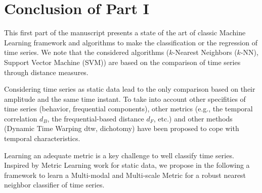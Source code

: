 \part*{Conclusion of Part I}
This first part of the manuscript presents a state of the art of classic Machine Learning framework and algorithms to make the classification or the regression of time series. We note that the considered algorithms ($k$-Nearest Neighbors ($k$-NN), Support Vector Machine (SVM)) are based on the comparison of time series through distance measures. 

Considering time series as static data lead to the only comparison based on their amplitude and the same time instant. To take into account other specifities of time series (behavior, frequential components), other metrics (e.g., the temporal correlation $d_B$, the frequential-based distance $d_F$, etc.) and other methods (Dynamic Time Warping {\sc dtw}, dichotomy) have been proposed to cope with temporal characteristics. 

Learning an adequate metric is a key challenge to well classify time series. Inspired by Metric Learning work for static data, we propose in the following a framework to learn a Multi-modal and Multi-scale Metric for a robust nearest neighbor classifier of time series.